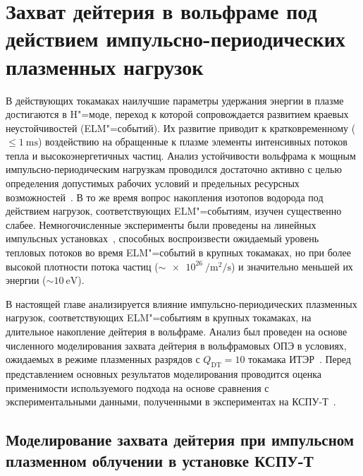 \chapter{Захват дейтерия в вольфраме под действием импульсно-периодических плазменных нагрузок}\label{ch:ch3}

В действующих токамаках наилучшие параметры удержания энергии в плазме достигаются в H"=моде, переход к которой сопровождается развитием краевых неустойчивостей (ELM"=событий). Их развитие приводит к кратковременному (\( \leq \SI{1}{\milli\second} \)) воздействию на обращенные к плазме элементы интенсивных потоков тепла и высокоэнергетичных частиц. Анализ устойчивости вольфрама к мощным импульсно-периодическим нагрузкам проводился достаточно активно с целью определения допустимых рабочих условий и предельных ресурсных возможностей~\cite{Pintsuk2012,Budaev2015,Rieth2019}. В то же время вопрос накопления изотопов водорода под действием нагрузок, соответствующих ELM"=событиям, изучен существенно слабее. Немногочисленные эксперименты были проведены на линейных импульсных установках~\cite{Poskakalov2020,Ogorodnikova,Nishijima2011}, способных воспроизвести ожидаемый уровень тепловых потоков во время ELM"=событий в крупных токамаках, но при более высокой плотности потока частиц (\(\sim\SI{e26}{\per\meter\squared\per\second}\)) и значительно меньшей их энергии (\(\sim\SI{10}{\electronvolt}\)).

В настоящей главе анализируется влияние импульсно-периодических плазменных нагрузок, соответствующих ELM"=событиям в крупных токамаках, на длительное накопление дейтерия в вольфраме. Анализ был проведен на основе численного моделирования захвата дейтерия в вольфрамовых ОПЭ в условиях, ожидаемых в режиме плазменных разрядов с \(Q_\mathrm{DT}=\num{10}\) токамака ИТЭР~\cite{Kulagin2025_JNM}. Перед представлением основных результатов моделирования проводится оценка применимости используемого подхода на основе сравнения с экспериментальными данными, полученными в экспериментах на КСПУ-Т~\cite{Poskakalov2020}.

\section{Моделирование захвата дейтерия при импульсном плазменном облучении в установке КСПУ-Т}\label{sec:ch3/sec1}

